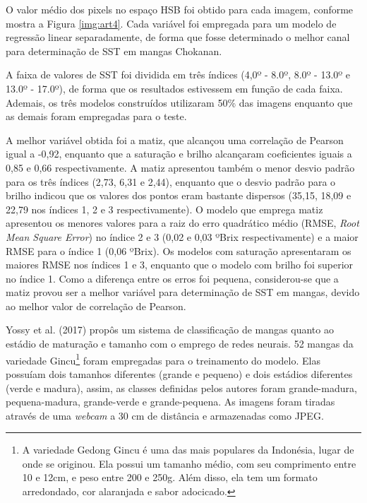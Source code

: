 O valor médio dos pixels no espaço HSB foi obtido para cada imagem, conforme mostra a Figura \ref{img:art4}. Cada variável foi empregada para um modelo de regressão linear separadamente, de forma que fosse determinado o melhor canal para determinação de SST em mangas Chokanan.


A faixa de valores de SST foi dividida em três índices (4,0º - 8.0º, 8.0º - 13.0º e 13.0º - 17.0º), de forma que os resultados estivessem em função de cada faixa. Ademais, os três modelos construídos utilizaram 50\% das imagens enquanto que as demais foram empregadas para o teste. 

A melhor variável obtida foi a matiz, que alcançou uma correlação de Pearson igual a -0,92, enquanto que a saturação e brilho alcançaram coeficientes iguais a 0,85 e 0,66 respectivamente. A matiz apresentou também o menor desvio padrão para os três índices (2,73, 6,31 e 2,44), enquanto que o desvio padrão para o brilho indicou que os valores dos pontos eram bastante dispersos (35,15, 18,09 e 22,79 nos índices 1, 2 e 3 respectivamente). O modelo que emprega matiz apresentou os menores valores para a raiz do erro quadrático médio (RMSE, \textit{Root Mean Square Error}) no índice 2 e 3 (0,02 e 0,03 ºBrix respectivamente) e a maior RMSE para o índice 1 (0,06 ºBrix). Os modelos com saturação apresentaram os maiores RMSE nos índices 1 e 3, enquanto que o modelo com brilho foi superior no índice 1. Como a diferença entre os erros foi pequena, considerou-se que a matiz provou ser a melhor variável para determinação de SST em mangas, devido ao melhor valor de correlação de Pearson. 

Yossy et al. (2017) propôs um sistema de classificação de mangas quanto ao estádio de maturação e tamanho com o emprego de redes neurais. 52 mangas da variedade Gincu\footnote{\label{ftnote:gincu}A variedade Gedong Gincu é uma das mais populares da Indonésia, lugar de onde se originou. Ela possui um tamanho médio, com seu comprimento entre 10 e 12cm, e peso entre 200 e 250g. Além disso, ela tem um formato arredondado, cor alaranjada e sabor adocicado.} foram empregadas para o treinamento do modelo. Elas possuíam dois tamanhos diferentes (grande e pequeno) e dois estádios diferentes (verde e madura), assim, as classes definidas pelos autores foram grande-madura, pequena-madura, grande-verde e grande-pequena. As imagens foram tiradas através de uma \textit{webcam} a 30 cm de distância e armazenadas como JPEG.

